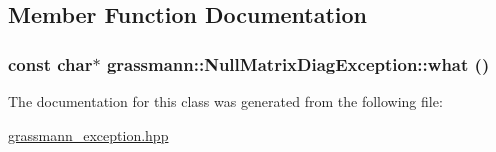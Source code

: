 \subsection{Member Function Documentation}
\hypertarget{classgrassmann_1_1NullMatrixDiagException_67594ad1531b5be5bc74717d5df48de3}{
\subsubsection[what]{\setlength{\rightskip}{0pt plus 5cm}const char$\ast$ grassmann::NullMatrixDiagException::what ()}}
\label{classgrassmann_1_1NullMatrixDiagException_67594ad1531b5be5bc74717d5df48de3}




The documentation for this class was generated from the following file:\begin{CompactItemize}
\item 
\hyperlink{grassmann__exception_8hpp}{grassmann\_\-exception.hpp}\end{CompactItemize}
